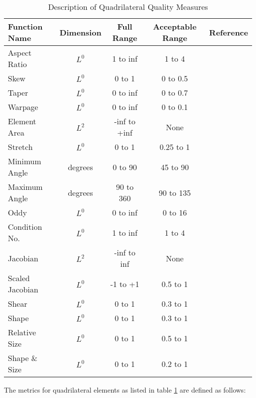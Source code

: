 \documentclass[10pt]{report}
\begin{document}
\begin{appendix}
\begin{table}[h]
\begin{center}
\begin{tabular}{|l|c|c|c|c|}
\hline
Function Name   & Dimension & Full Range &Acceptable Range &  Reference \\
\hline
Aspect Ratio    &   $L^0$ &    1 to inf  &    1 to 4    & \cite{robinson} \\
Skew            &   $L^0$ &    0 to 1    &    0 to 0.5  & \cite{robinson} \\
Taper           &   $L^0$ &    0 to inf  &    0 to 0.7  & \cite{robinson} \\
Warpage         &   $L^0$ &    0 to inf  &    0 to 0.1  & \cite{robinson} \\
Element Area    &   $L^2$ & -inf to +inf &     None     & \cite{robinson} \\
Stretch         &   $L^0$ &    0 to 1    & 0.25 to 1    &                 \\
Minimum Angle   &  degrees&   0 to 90    &  45 to 90    &         \\
Maximum Angle   &  degrees&  90 to 360   &  90 to 135   &         \\
Oddy            &   $L^0$ &    0 to inf  &    0 to 16   & \cite{oddy}\cite{knupp2000} \\
Condition No.   &   $L^0$ &    1 to inf  &    1 to 4    & \cite{knupp2000} \\
Jacobian        &   $L^2$ & -inf to inf  &     None     & \cite{knupp2000} \\
Scaled Jacobian &   $L^0$ &   -1 to +1   &  0.5 to 1    & \cite{knupp2000} \\
Shear           &   $L^0$ &    0 to 1    &  0.3 to 1    & \cite{knupp2002} \\
Shape           &   $L^0$ &    0 to 1    &  0.3 to 1    & \cite{knupp2002} \\
Relative Size   &   $L^0$ &    0 to 1    &  0.5 to 1    & \cite{knupp2002} \\
Shape \& Size   &   $L^0$ &    0 to 1    &  0.2 to 1    & \cite{knupp2002} \\
\hline
\end{tabular}
\end{center}
\T\caption{Description of Quadrilateral Quality Measures}
\label{tab:quad}
\end{table}


The metrics for quadrilateral elements as listed in table 
\ref{tab:quad} are defined as follows:
\T\bigskip
\htmlrule


\end{appendix}
\end{document}
